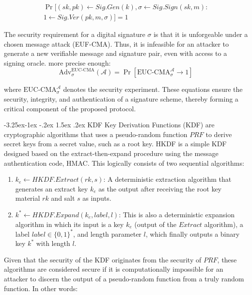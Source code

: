 \documentclass[a4paper,fleqn]{cas-dc}
\makeatletter
\renewcommand\subsubsection{\@startsection{subsubsection}{3}{\z@}%
   {-3.25ex\@plus -1ex \@minus -.2ex}%
   {1.5ex \@plus .2ex}%
   {\normalfont\normalsize}} %
\makeatother
\begin{document}
\begin{equation}
    \begin{split}
        \Pr [(sk,pk)\leftarrow Sig.Gen(k),\sigma \leftarrow Sig.Sign(sk,m):\\ 1 \leftarrow Sig.Ver(pk,m,\sigma) ] =1  
    \end{split}
\end{equation}

The security requirement for a digital signature $\sigma$ is that it is unforgeable under a chosen message attack (EUF-CMA). Thus, it is infeasible for an attacker to generate a new verifiable message and signature pair, even with access to a signing oracle. more precise enough:
\begin{equation}
    \text{Adv}_{\sigma}^{\text{EUC-CMA}}(\mathcal{A}) = \Pr \left[ \text{EUC-CMA}_{\sigma}^{\mathcal{A}} \rightarrow 1 \right] 
\end{equation}

\noindent where $\text{EUC-CMA}_{\sigma}^{\mathcal{A}}$ denotes the security experiment.
These equations ensure the security, integrity, and authentication of a signature scheme, thereby forming a critical component of the proposed protocol.


\subsubsection{KDF}
Key Derivation Functions (KDF) are  cryptographic algorithms that uses a pseudo-random function $PRF$ to derive secret keys from a secret value, such as a root key. 
HKDF \citep{Cryptographic_extraction} is a simple KDF designed based on the extract-then-expand procedure using the message authentication code, HMAC. 
This logically consists of two sequential algorithms:
\begin{enumerate}
    \item $k_{e} \leftarrow HKDF.Extract(rk, s)$: A deterministic extraction algorithm that generates an extract key $k_{e}$ as the output after receiving the root key material $rk$ and salt $s$ as inputs.
    \item $k^{*} \leftarrow HKDF.Expand(k_{e}, label, l)$: This is also a deterministic expansion algorithm in which its input is a key $k_{e}$ (output of the $Extract$ algorithm), a label $label \in \{0,1\}^{*}$, and length parameter $l$, which finally outputs a binary key $k^{*}$ with length $l$.
\end{enumerate}

Given that the security of the KDF originates from the security of  $PRF$, these algorithms are considered secure if it is computationally impossible for an attacker to discern the output of a pseudo-random function from a truly random function. 
In other words:
\end{document}
